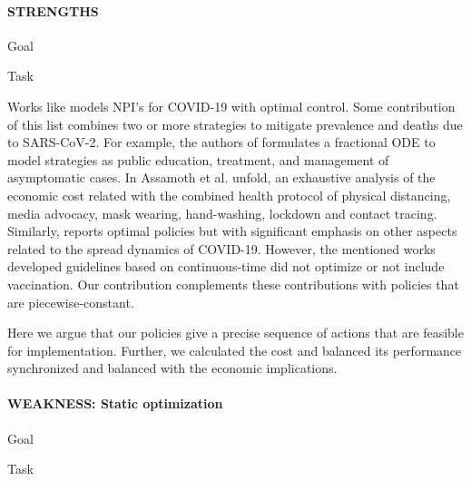     \paragraph{STRENGTHS}
        \begin{CheckList}{Goal}
                \begin{CheckList}{Task}
                \end{CheckList}
        \end{CheckList}
        
        Works like
    \cite{Perkins2020,Palmer2020,Djidjou2020,Asamoah2021,Nabi2021} 
    models NPI's for COVID-19 with optimal control. Some 
    contribution of this list  combines two or more strategies to
    mitigate prevalence and deaths due to SARS-CoV-2. 
    For example, the authors of %
    \cite{Nabi2021} formulates a fractional ODE to model strategies as public
    education, treatment, and management of asymptomatic cases.  
    In \cite{Asamoah2021} Assamoth et al. unfold, an exhaustive analysis
    of the economic cost related with the combined health protocol of 
    physical distancing, media advocacy, mask wearing, hand-washing, 
    lockdown and contact tracing.
    Similarly, \cite{Djomegni2021,Jiang2020,Ullah2020}
    reports optimal policies but with significant emphasis on other aspects 
    related to the spread dynamics of COVID-19. However, the mentioned works 
    developed guidelines based on continuous-time did not optimize or not 
    include vaccination. Our contribution complements these contributions 
    with policies that are piecewise-constant. 
	    
	   Here we argue that our policies give a precise sequence of actions that 
    are feasible for implementation. Further, we calculated the cost and 
    balanced its performance synchronized and balanced with the economic 
    implications.

    \paragraph{WEAKNESS: Static optimization }
        \begin{CheckList}{Goal}
                \begin{CheckList}{Task}
                \end{CheckList}
        \end{CheckList}
    

